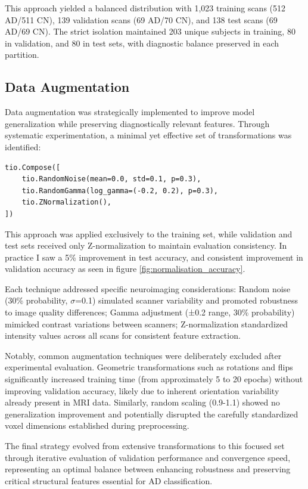 \documentclass[11pt, a4paper]{article}
\begin{document}
This approach yielded a balanced distribution with 1,023 training scans (512 AD/511 CN), 139 validation scans (69 AD/70 CN), and 138 test scans (69 AD/69 CN). The strict isolation maintained 203 unique subjects in training, 80 in validation, and 80 in test sets, with diagnostic balance preserved in each partition.

\subsection{Data Augmentation}

Data augmentation was strategically implemented to improve model generalization while preserving diagnostically relevant features. Through systematic experimentation, a minimal yet effective set of transformations was identified:

\begin{verbatim}
tio.Compose([
    tio.RandomNoise(mean=0.0, std=0.1, p=0.3),
    tio.RandomGamma(log_gamma=(-0.2, 0.2), p=0.3),
    tio.ZNormalization(),
])
\end{verbatim}

This approach was applied exclusively to the training set, while validation and test sets received only Z-normalization to maintain evaluation consistency. In practice I saw a 5\% improvement in test accuracy, and consistent improvement in validation accuracy as seen in figure \ref{fig:normalisation_accuracy}.

Each technique addressed specific neuroimaging considerations: Random noise (30\% probability, $\sigma$=0.1) simulated scanner variability and promoted robustness to image quality differences; Gamma adjustment (±0.2 range, 30\% probability) mimicked contrast variations between scanners; Z-normalization standardized intensity values across all scans for consistent feature extraction.

Notably, common augmentation techniques were deliberately excluded after experimental evaluation. Geometric transformations such as rotations and flips significantly increased training time (from approximately 5 to 20 epochs) without improving validation accuracy, likely due to inherent orientation variability already present in MRI data. Similarly, random scaling (0.9-1.1) showed no generalization improvement and potentially disrupted the carefully standardized voxel dimensions established during preprocessing.

The final strategy evolved from extensive transformations to this focused set through iterative evaluation of validation performance and convergence speed, representing an optimal balance between enhancing robustness and preserving critical structural features essential for AD classification.
\end{document}
